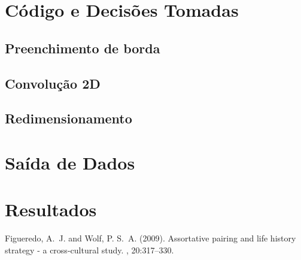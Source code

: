 \documentclass[twoside,twocolumn]{article}
\begin{document}

\section{Código e Decisões Tomadas}

\subsection{Preenchimento de borda}

\subsection{Convolução 2D}

\subsection{Redimensionamento}



\section{Saída de Dados}


\section{Resultados}


\begin{thebibliography}{99} %

Figueredo, A.~J. and Wolf, P. S.~A. (2009).
\newblock Assortative pairing and life history strategy - a cross-cultural
  study.
, 20:317--330.
 
\end{thebibliography}

\end{document}
